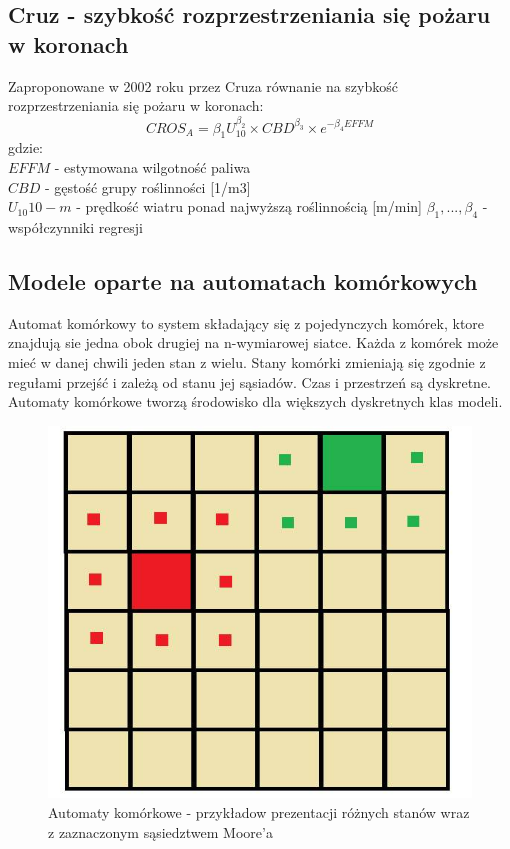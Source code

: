 \documentclass[a4paper, 11pt]{article}
\begin{document}
	\subsection{Cruz - szybkość rozprzestrzeniania się pożaru w koronach}
	\indent
	Zaproponowane w 2002 roku przez Cruza równanie na szybkość rozprzestrzeniania się pożaru w koronach: 
	$$
	CROS_A=\beta_1U^{\beta_2}_10 \times CBD^{\beta_3} \times e^{-\beta_4EFFM}
	$$
	gdzie: \\
	$EFFM$ - estymowana wilgotność paliwa \\
	$CBD$ - gęstość grupy roślinności [1/m3]\\
	$U_10  10-m$ - prędkość wiatru ponad najwyższą roślinnością [m/min]
	$\beta_1, ...,\beta_4$ -współczynniki regresji\\
	\subsection{Modele oparte na automatach komórkowych}	
	\indent
	
	Automat komórkowy to system składający się z pojedynczych komórek, ktore znajdują sie jedna obok drugiej na n-wymiarowej siatce. Każda z komórek może mieć w danej chwili jeden stan z wielu. Stany komórki zmieniają się zgodnie z regułami przejść i zależą od stanu jej sąsiadów. Czas i przestrzeń są dyskretne.\\
	
	Automaty komórkowe tworzą środowisko dla większych dyskretnych klas modeli.
	\begin{figure}[H]
		\centerline{\includegraphics[scale=0.4]{automaty}}
		\raggedright{	\caption{Automaty komórkowe - przykładow prezentacji różnych stanów wraz z zaznaczonym sąsiedztwem Moore'a}}
	\end{figure}
	\newpage
\end{document}
